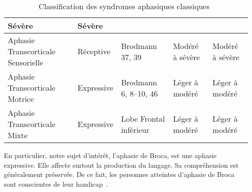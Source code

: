 \begin{table}[ht]
\begin{adjustbox}{max width=15cm}
\begin{tabular}{|p{3cm}|p{3cm}|p{3cm}|p{3cm}|p{3cm}|}
        Sévère                                                  &
        Sévère                                                  \\
        \hline
        Aphasie Transcorticale Sensorielle                      &
        Réceptive                                               &
        Brodmann 37, 39                                         &
        Modéré à sévère                                         &
        Modéré à sévère                                         \\
        \hline
        Aphasie Transcorticale Motrice                          &
        Expressive                                              &
        Brodmann 6, 8--10, 46                                   &
        Léger à modéré                                          &
        Léger à modéré                                          \\
        \hline
        Aphasie Transcorticale Mixte                            &
        Expressive                                              &
        Lobe Frontal inférieur                                  &
        Léger à modéré                                          &
        Léger à modéré                                          \\
        \hline
        \end{tabular}
    \end{adjustbox}
    \caption[{Classification des syndromes aphasiques classiques~\cite{Hallowell_2017}}]%
    {Classification des syndromes aphasiques classiques~\cite{Hallowell_2017}}
    \label{tab.aphasia-classification}
\end{table}
En particulier, notre sujet d'intérêt, l'aphasie de Broca, est une aphasie expressive.
Elle affecte surtout la production du langage.
Sa compréhension est généralement préservée.
De ce fait, les personnes atteintes d'aphasie de Broca sont conscientes de leur handicap~\cite{Chapey_2008}.
